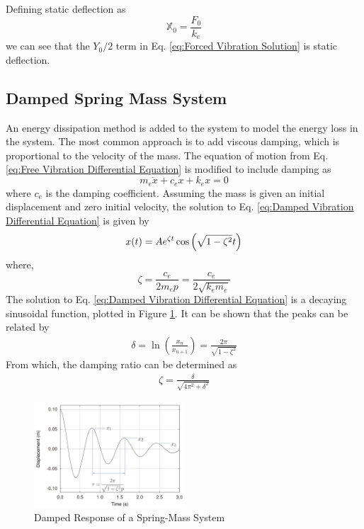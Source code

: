Defining static deflection as 
\begin{equation}
    \mathbb{X}_0 = \frac{F_0}{k_e} \label{eq:Static Deflection}
\end{equation}
we can see that the $Y_0/2$ term in Eq. \ref{eq:Forced Vibration Solution} is static deflection.

\subsection{Damped Spring Mass System}
An energy dissipation method is added to the system to model the energy loss in the system. The most common approach is to add viscous damping, which is proportional to the velocity of the mass. The equation of motion from Eq. \ref{eq:Free Vibration Differential Equation} is modified to include damping as
\begin{equation}
    m_e\ddot{x} + c_e\dot{x} + k_ex = 0 \label{eq:Damped Vibration Differential Equation}
\end{equation}
where $c_e$ is the damping coefficient. Assuming the mass is given an initial displacement and zero initial velocity, the solution to Eq. \ref{eq:Damped Vibration Differential Equation} is given by
\begin{equation}
    x(t) = A e^{\- \zeta t}\cos\left(\sqrt{1 - \zeta^2}t \right) \label{eq:Damped Vibration Solution}
\end{equation}
where, 
\begin{equation}
    \zeta = \frac{c_e}{2m_e p} = \frac{c_e}{2\sqrt{k_e m_e}} \label{eq:Damping Ratio}
\end{equation}
The solution to Eq. \ref{eq:Damped Vibration Differential Equation} is a decaying sinusoidal function, plotted in Figure \ref{fig:Damped Response}. It can be shown that the peaks can be related by
\begin{align}
    \delta = \ln \left(\frac{x_{n}}{x_{n+1}}\right) = \frac{2\pi}{\sqrt{1 - \zeta^2}} \label{eq:Decay Ratio Delta} 
\end{align}
From which, the damping ratio can be determined as 
\begin{align}
    \zeta = \frac{\delta}{\sqrt{4\pi^2 + \delta^2}} \label{eq:Damping Ratio Calculated With Delta}
\end{align}
\begin{figure}[h]
    \centering
    \includegraphics[width=0.5\textwidth]{Sections/Figures/damped response.png}
    \caption{Damped Response of a Spring-Mass System}
    \label{fig:Damped Response}
\end{figure}